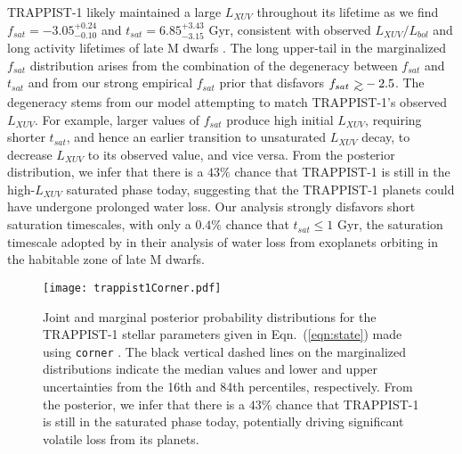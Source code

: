 \documentclass[twocolumn]{aastex62}
\def\gsim{~\rlap{$>$}{\lower 1.0ex\hbox{$\sim$}}}
\begin{document}
TRAPPIST-1 likely maintained a large $L_{XUV}$ throughout its lifetime as we find $f_{sat} = -3.05^{+0.24}_{-0.10}$ and $t_{sat} = 6.85^{+3.43}_{-3.15}$ Gyr, consistent with observed $L_{XUV}/L_{bol}$ and long activity lifetimes of late M dwarfs \citep{West2008,Wright2018}. The long upper-tail in the marginalized $f_{sat}$ distribution arises from the combination of the degeneracy between $f_{sat}$ and $t_{sat}$ and from our strong empirical $f_{sat}$ prior that disfavors $f_{sat} \gsim -2.5$. The degeneracy stems from our model attempting to match TRAPPIST-1's observed $L_{XUV}$. For example, larger values of $f_{sat}$ produce high initial $L_{XUV}$, requiring shorter $t_{sat}$, and hence an earlier transition to unsaturated $L_{XUV}$ decay, to decrease $L_{XUV}$ to its observed value, and vice versa. From the posterior distribution, we infer that there is a $43\%$ chance that TRAPPIST-1 is still in the high-$L_{XUV}$ saturated phase today, suggesting that the TRAPPIST-1 planets could have undergone prolonged water loss. Our analysis strongly disfavors short saturation timescales, with only a $0.4\%$ chance that $t_{sat} \leq 1$ Gyr, the saturation timescale adopted by \citet{Luger2015} in their analysis of water loss from exoplanets orbiting in the habitable zone of late M dwarfs.

\begin{figure*}[t]
\centering
	\texttt{[image: trappist1Corner.pdf]}
   \caption{Joint and marginal posterior probability distributions for the TRAPPIST-1 stellar parameters given in Eqn.~(\ref{eqn:state}) made using \texttt{corner} \citep{ForemanMackey2016}. The black vertical dashed lines on the marginalized distributions indicate the median values and lower and upper uncertainties from the 16th and 84th percentiles, respectively. From the posterior, we infer that there is a $43\%$ chance that TRAPPIST-1 is still in the saturated phase today, potentially driving significant volatile loss from its planets.}%
    \label{fig:corner}%
\end{figure*}
\end{document}
